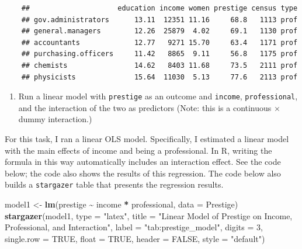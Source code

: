 \documentclass[
]{article}
\newenvironment{Shaded}{\begin{snugshade}}{\end{snugshade}}
\newcommand{\AttributeTok}[1]{\textcolor[rgb]{0.13,0.29,0.53}{#1}}
\newcommand{\ConstantTok}[1]{\textcolor[rgb]{0.56,0.35,0.01}{#1}}
\newcommand{\DecValTok}[1]{\textcolor[rgb]{0.00,0.00,0.81}{#1}}
\newcommand{\FunctionTok}[1]{\textcolor[rgb]{0.13,0.29,0.53}{\textbf{#1}}}
\newcommand{\NormalTok}[1]{#1}
\newcommand{\OtherTok}[1]{\textcolor[rgb]{0.56,0.35,0.01}{#1}}
\newcommand{\SpecialCharTok}[1]{\textcolor[rgb]{0.81,0.36,0.00}{\textbf{#1}}}
\newcommand{\StringTok}[1]{\textcolor[rgb]{0.31,0.60,0.02}{#1}}
\begin{document}
\begin{Shaded}
\end{Shaded}

\begin{verbatim}
	##                     education income women prestige census type
	## gov.administrators      13.11  12351 11.16     68.8   1113 prof
	## general.managers        12.26  25879  4.02     69.1   1130 prof
	## accountants             12.77   9271 15.70     63.4   1171 prof
	## purchasing.officers     11.42   8865  9.11     56.8   1175 prof
	## chemists                14.62   8403 11.68     73.5   2111 prof
	## physicists              15.64  11030  5.13     77.6   2113 prof
\end{verbatim}

\newpage 

\begin{enumerate}
	\item [(\textbf{b})]
Run a linear model with \texttt{prestige} as an outcome and \texttt{income}, \texttt{professional}, and the interaction of the two as predictors (Note: this is a continuous $\times$ dummy interaction.)
\end{enumerate}

For this task, I ran a linear OLS model. Specifically, I estimated a linear model with the main effects of income and being a professional. In R, writing the formula in this way automatically includes an interaction effect. See the code below; the code also shows the results of this regression. The code below also builds a \texttt{stargazer} table that presents the regression results.

\begin{Shaded}
\begin{Highlighting}[]
\NormalTok{model1 }\OtherTok{\textless{}{-}} \FunctionTok{lm}\NormalTok{(prestige }\SpecialCharTok{\textasciitilde{}}\NormalTok{ income }\SpecialCharTok{*}\NormalTok{ professional, }\AttributeTok{data =}\NormalTok{ Prestige)}
\FunctionTok{stargazer}\NormalTok{(model1,}
          \AttributeTok{type =} \StringTok{"latex"}\NormalTok{,       }
          \AttributeTok{title =} \StringTok{"Linear Model of Prestige on Income, Professional, and Interaction"}\NormalTok{,}
          \AttributeTok{label =} \StringTok{"tab:prestige\_model"}\NormalTok{,}
          \AttributeTok{digits =} \DecValTok{3}\NormalTok{,}
          \AttributeTok{single.row =} \ConstantTok{TRUE}\NormalTok{,}
          \AttributeTok{float =} \ConstantTok{TRUE}\NormalTok{,}
          \AttributeTok{header =} \ConstantTok{FALSE}\NormalTok{,}
          \AttributeTok{style =} \StringTok{"default"}\NormalTok{) }
\end{Highlighting}
\end{Shaded}
\end{document}
